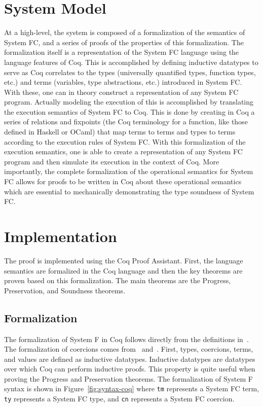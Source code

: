 \documentclass{sig-alternate}
\begin{document}
\section{System Model}
\label{sec:model}
At a high-level, the system is composed of a formalization of the semantics of System FC, and a series of proofs of the properties of this formalization. The formalization itself is a representation of the System FC language using the language features of Coq. This is accomplished by defining inductive datatypes to serve as Coq correlates to the types (universally quantified types, function types, etc.) and terms (variables, type abstractions, etc.) introduced in System FC.  With these, one can in theory construct a representation of any System FC program. Actually modeling the execution of this is accomplished by translating the execution semantics of System FC to Coq. This is done by creating in Coq a series of relations and fixpoints (the Coq terminology for a function, like those defined in Haskell or OCaml) that map terms to terms and types to terms according to the execution rules of System FC. With this formalization of the execution semantics, one is able to create a representation of any System FC program and then simulate its execution in the context of Coq. More importantly, the complete formalization of the operational semantics for System FC allows for proofs to be written in Coq about these operational semantics which are essential to mechanically demonstrating the type soundness of System FC.

\section{Implementation}
\label{sec:implementation}

The proof is implemented using the Coq Proof Assistant. First, the language semantics are formalized in the Coq language and then the key theorems are proven based on this formalization. The main theorems are the Progress, Preservation, and Soundness theorems.

\subsection{Formalization}
\label{sec:implementation-formalization}

The formalization of System F in Coq follows directly from the definitions in~\cite{Pierce:TAPL}. The formalization of coercions comes from~\cite{Breitner:2014:SZC:2628136.2628141} and~\cite{DBLP:conf/tldi/YorgeyWCJVM12}. First, types, coercions, terms, and values are defined as inductive datatypes. Inductive datatypes are datatypes over which Coq can perform inductive proofs. This property is quite useful when proving the Progress and Preservation theorems. The formalization of System F syntax is shown in Figure~\ref{fig:syntax-coq} where \texttt{tm} represents a System FC term,  \texttt{ty} represents a System FC type, and \texttt{cn} represents a System FC coercion.
\end{document}
